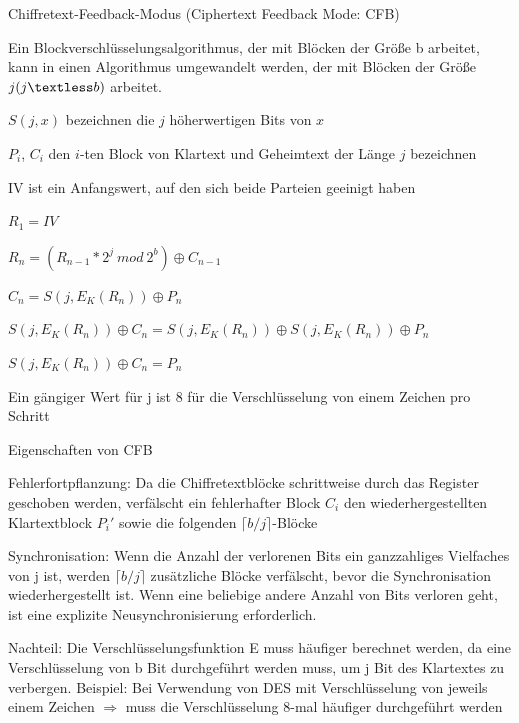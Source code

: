\documentclass[a4paper]{article}
\begin{document}
\begin{multicols}{3}
      Chiffretext-Feedback-Modus (Ciphertext Feedback Mode: CFB)
      \begin{itemize*}
            \item Ein Blockverschlüsselungsalgorithmus, der mit Blöcken der Größe b arbeitet, kann in einen Algorithmus umgewandelt werden, der mit Blöcken der Größe $j (j\textless b)$ arbeitet.
            \begin{itemize*}
                  \item $S(j, x)$ bezeichnen die $j$ höherwertigen Bits von $x$
                  \item $P_i$, $C_i$ den $i$-ten Block von Klartext und Geheimtext der Länge $j$ bezeichnen
                  \item IV ist ein Anfangswert, auf den sich beide Parteien geeinigt haben
                  \item $R_1 = IV$
                  \item $R_n = (R_{n-1}*2^j\ mod\ 2^b)\oplus C_{n-1}$
                  \item $C_n = S(j,E_K(R_n))\oplus P_n$
                  \item $S(j,E_K(R_n))\oplus C_n = S(j,E_K(R_n))\oplus S(j,E_K(R_n))\oplus P_n$
                  \item $S(j,E_K(R_n))\oplus C_n = P_n$
            \end{itemize*}
            \item Ein gängiger Wert für j ist 8 für die Verschlüsselung von einem Zeichen pro Schritt
            \item Eigenschaften von CFB
            \begin{itemize*}
                  \item Fehlerfortpflanzung: Da die Chiffretextblöcke schrittweise durch das Register geschoben werden, verfälscht ein fehlerhafter Block $C_i$ den wiederhergestellten Klartextblock $P_i'$ sowie die folgenden $\lceil b / j\rceil$-Blöcke
                  \item Synchronisation: Wenn die Anzahl der verlorenen Bits ein ganzzahliges Vielfaches von j ist, werden $\lceil b / j\rceil$ zusätzliche Blöcke verfälscht, bevor die Synchronisation wiederhergestellt ist. Wenn eine beliebige andere Anzahl von Bits verloren geht, ist eine explizite Neusynchronisierung erforderlich.
                  \item Nachteil: Die Verschlüsselungsfunktion E muss häufiger berechnet werden, da eine Verschlüsselung von b Bit durchgeführt werden muss, um j Bit des Klartextes zu verbergen. Beispiel: Bei Verwendung von DES mit Verschlüsselung von jeweils einem Zeichen $\Rightarrow$ muss die Verschlüsselung 8-mal häufiger durchgeführt werden
            \end{itemize*}
      \end{itemize*}


\end{multicols}
\end{document}
